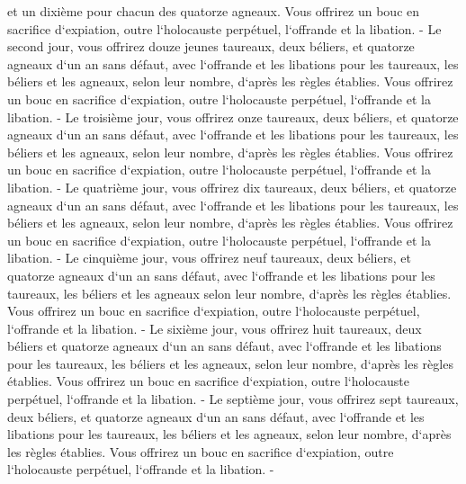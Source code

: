 \verse et un dixième pour chacun des quatorze agneaux. 
\verse Vous offrirez un bouc en sacrifice d`expiation, outre l`holocauste perpétuel, l`offrande et la libation. - 
\verse Le second jour, vous offrirez douze jeunes taureaux, deux béliers, et quatorze agneaux d`un an sans défaut, 
\verse avec l`offrande et les libations pour les taureaux, les béliers et les agneaux, selon leur nombre, d`après les règles établies. 
\verse Vous offrirez un bouc en sacrifice d`expiation, outre l`holocauste perpétuel, l`offrande et la libation. - 
\verse Le troisième jour, vous offrirez onze taureaux, deux béliers, et quatorze agneaux d`un an sans défaut, 
\verse avec l`offrande et les libations pour les taureaux, les béliers et les agneaux, selon leur nombre, d`après les règles établies. 
\verse Vous offrirez un bouc en sacrifice d`expiation, outre l`holocauste perpétuel, l`offrande et la libation. - 
\verse Le quatrième jour, vous offrirez dix taureaux, deux béliers, et quatorze agneaux d`un an sans défaut, 
\verse avec l`offrande et les libations pour les taureaux, les béliers et les agneaux, selon leur nombre, d`après les règles établies. 
\verse Vous offrirez un bouc en sacrifice d`expiation, outre l`holocauste perpétuel, l`offrande et la libation. - 
\verse Le cinquième jour, vous offrirez neuf taureaux, deux béliers, et quatorze agneaux d`un an sans défaut, 
\verse avec l`offrande et les libations pour les taureaux, les béliers et les agneaux selon leur nombre, d`après les règles établies. 
\verse Vous offrirez un bouc en sacrifice d`expiation, outre l`holocauste perpétuel, l`offrande et la libation. - 
\verse Le sixième jour, vous offrirez huit taureaux, deux béliers et quatorze agneaux d`un an sans défaut, 
\verse avec l`offrande et les libations pour les taureaux, les béliers et les agneaux, selon leur nombre, d`après les règles établies. 
\verse Vous offrirez un bouc en sacrifice d`expiation, outre l`holocauste perpétuel, l`offrande et la libation. - 
\verse Le septième jour, vous offrirez sept taureaux, deux béliers, et quatorze agneaux d`un an sans défaut, 
\verse avec l`offrande et les libations pour les taureaux, les béliers et les agneaux, selon leur nombre, d`après les règles établies. 
\verse Vous offrirez un bouc en sacrifice d`expiation, outre l`holocauste perpétuel, l`offrande et la libation. - 
